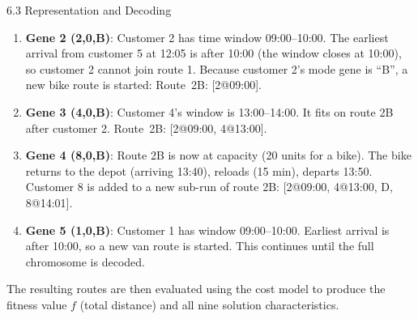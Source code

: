 \documentclass[aspectratio=169,10pt]{beamer}
\begin{document}
\begin{frame}[allowframebreaks]{6.3 Representation and Decoding}
\begin{enumerate}
  \item \textbf{Gene 2 (2,0,B)}: Customer 2 has time window 09:00--10:00.
        The earliest arrival from customer 5 at 12:05 is after 10:00
        (the window closes at 10:00), so customer 2 cannot join route 1.
        Because customer 2's mode gene is ``B'', a new bike route is
        started: Route~2B: [2@09:00].

  \item \textbf{Gene 3 (4,0,B)}: Customer 4's window is 13:00--14:00.
        It fits on route 2B after customer 2.
        Route~2B: [2@09:00, 4@13:00].

  \item \textbf{Gene 4 (8,0,B)}: Route 2B is now at capacity (20 units
        for a bike).
        The bike returns to the depot (arriving 13:40), reloads (15 min),
        departs 13:50.
        Customer 8 is added to a new sub-run of route 2B: [2@09:00,
        4@13:00, D, 8@14:01].

  \item \textbf{Gene 5 (1,0,B)}: Customer 1 has window 09:00--10:00.
        Earliest arrival is after 10:00, so a new van route is started.
        This continues until the full chromosome is decoded.
\end{enumerate}

The resulting routes are then evaluated using the cost model to
produce the fitness value $f$ (total distance) and all nine
solution characteristics.

\end{frame}
\end{document}
